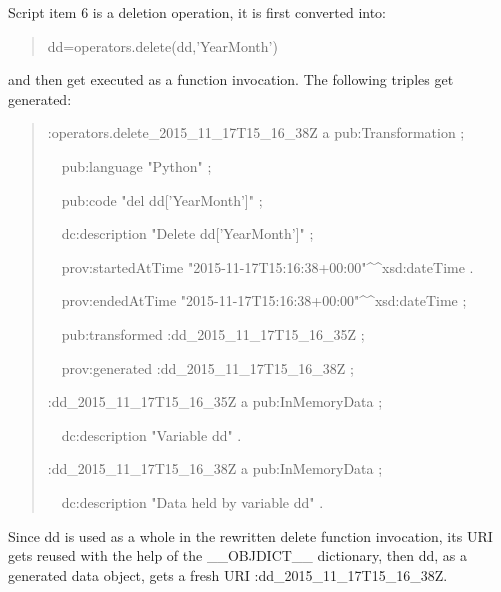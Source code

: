 Script item 6 is a deletion operation, it is first converted into:
\begin{quotation}
	\noindent dd=operators.delete(dd,'YearMonth')
\end{quotation}
and then get executed as a function invocation. The following triples get generated:
\begin{quotation}
	\noindent :operators.delete\_2015\_11\_17T15\_16\_38Z a pub:Transformation ;
	
	\noindent\ \ pub:language "Python" ;
	
	\noindent\ \ pub:code "del dd['YearMonth']" ;
	
	\noindent\ \ dc:description "Delete dd['YearMonth']" ;
	
	\noindent\ \ prov:startedAtTime "2015-11-17T15:16:38+00:00"\^{}\^{}xsd:dateTime .
	
	\noindent\ \ prov:endedAtTime "2015-11-17T15:16:38+00:00"\^{}\^{}xsd:dateTime ;
	
	\noindent\ \ pub:transformed :dd\_2015\_11\_17T15\_16\_35Z ;
	
	\noindent\ \ prov:generated :dd\_2015\_11\_17T15\_16\_38Z ;
	
	\noindent:dd\_2015\_11\_17T15\_16\_35Z a pub:InMemoryData ;

	\noindent\ \ dc:description "Variable dd" .

	\noindent:dd\_2015\_11\_17T15\_16\_38Z a pub:InMemoryData ;
	
	\noindent\ \ dc:description "Data held by variable dd" .
\end{quotation}
Since dd is used as a whole in the rewritten delete function invocation, its URI gets reused with the help of the \_\_OBJDICT\_\_ dictionary, then dd, as a generated data object, gets a fresh URI :dd\_2015\_11\_17T15\_16\_38Z.

